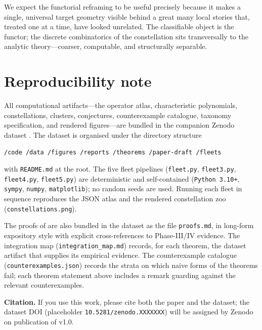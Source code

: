 \documentclass[11pt,a4paper]{article}
\theoremstyle{plain}
\theoremstyle{definition}
\theoremstyle{remark}
\begin{document}
We expect the functorial reframing to be useful precisely because it
makes a single, universal target geometry visible behind a great many
local stories that, treated one at a time, have looked unrelated. The
classifiable object is the functor; the discrete combinatorics of the
constellation sits transversally to the analytic theory---coarser,
computable, and structurally separable.

\section{Reproducibility note}\label{sec:reproducibility}

All computational artifacts---the operator atlas, characteristic
polynomials, constellations, clusters, conjectures, counterexample
catalogue, taxonomy specification, and rendered figures---are bundled in
the companion Zenodo dataset \cite{wkb_dataset_v1}. The dataset is
organised under the directory structure
\begin{center}
\texttt{/code\ /data\ /figures\ /reports\ /theorems\ /paper-draft\ /fleets}
\end{center}
with \texttt{README.md} at the root. The five fleet pipelines
(\texttt{fleet.py}, \texttt{fleet3.py}, \texttt{fleet4.py},
\texttt{fleet5.py}) are deterministic and self-contained
(\texttt{Python 3.10+}, \texttt{sympy}, \texttt{numpy},
\texttt{matplotlib}); no random seeds are used. Running each fleet in
sequence reproduces the JSON atlas and the rendered constellation zoo
(\texttt{constellations.png}).

The proofs of 
are also bundled in the dataset as the file \texttt{proofs.md}, in
long-form expository style with explicit cross-references to
Phase-III/IV evidence. The integration map
(\texttt{integration\_map.md}) records, for each theorem, the dataset
artifact that supplies its empirical evidence. The counterexample
catalogue (\texttt{counterexamples.json}) records the strata on which
naive forms of the theorems fail; each theorem statement above includes
a remark guarding against the relevant counterexamples.

\medskip
\noindent\textbf{Citation.} If you use this work, please cite both the
paper and the dataset; the dataset DOI (placeholder
\texttt{10.5281/zenodo.XXXXXXX}) will be assigned by Zenodo on
publication of v1.0.
\end{document}
